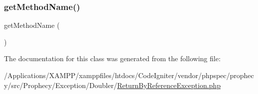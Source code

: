 \subsubsection{\texorpdfstring{get\+Method\+Name()}{getMethodName()}}
{\footnotesize\ttfamily get\+Method\+Name (\begin{DoxyParamCaption}{ }\end{DoxyParamCaption})}



The documentation for this class was generated from the following file\+:\begin{DoxyCompactItemize}
\item 
/\+Applications/\+X\+A\+M\+P\+P/xamppfiles/htdocs/\+Code\+Igniter/vendor/phpspec/prophecy/src/\+Prophecy/\+Exception/\+Doubler/\mbox{\hyperlink{_return_by_reference_exception_8php}{Return\+By\+Reference\+Exception.\+php}}\end{DoxyCompactItemize}
